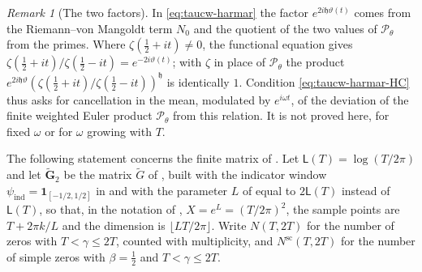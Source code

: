 \documentclass[11pt,a4paper]{article}
\numberwithin{equation}{section}
\theoremstyle{definition}
\theoremstyle{remark}
\newtheorem{remark}[theorem]{Remark}
\newcommand{\ind}{\mathbf 1}
\begin{document}
\begin{remark}[The two factors]\label{rem:taucw-harmar}
In \eqref{eq:taucw-harmar} the factor $e^{2i\mathfrak h\vartheta(t)}$ comes from the Riemann--von Mangoldt term $N_0$ and the quotient of the two values of $\mathcal P_\theta$ from the primes. Where $\zeta(\frac12+it)\ne0$, the functional equation gives $\zeta(\frac12+it)/\zeta(\frac12-it)=e^{-2i\vartheta(t)}$; with $\zeta$ in place of $\mathcal P_\theta$ the product $e^{2i\mathfrak h\vartheta}(\zeta(\frac12+it)/\zeta(\frac12-it))^{\mathfrak h}$ is identically $1$. Condition \eqref{eq:taucw-harmar-HC} thus asks for cancellation in the mean, modulated by $e^{i\omega t}$, of the deviation of the finite weighted Euler product $\mathcal P_\theta$ from this relation. It is not proved here, for fixed $\omega$ or for $\omega$ growing with $T$.
\end{remark}

The following statement concerns the finite matrix of \cite[\S2.3]{AlpogeFurman2026}. Let $\mathsf L(T)=\log(T/2\pi)$ and let $\widetilde{\mathbf G}_2$ be the matrix $\widetilde G$ of \cite[(2.10)]{AlpogeFurman2026}, built with the indicator window $\psi_{\mathrm{ind}}=\ind_{[-1/2,1/2]}$ in \cite[(2.6)]{AlpogeFurman2026} and with the parameter $L$ of \cite[(2.7)]{AlpogeFurman2026} equal to $2\mathsf L(T)$ instead of $\mathsf L(T)$, so that, in the notation of \cite{AlpogeFurman2026}, $X=e^L=(T/2\pi)^2$, the sample points are $T+2\pi k/L$ and the dimension is $\lfloor LT/2\pi\rfloor$. Write $N(T,2T)$ for the number of zeros with $T<\gamma\le2T$, counted with multiplicity, and $N^{\mathrm{sc}}(T,2T)$ for the number of simple zeros with $\beta=\frac12$ and $T<\gamma\le2T$.
\end{document}
